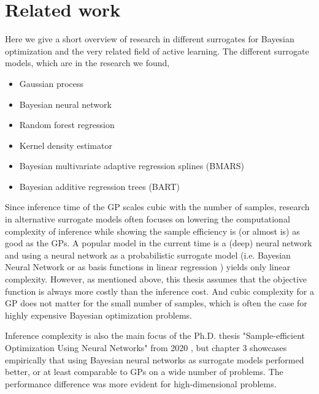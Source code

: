     

\section{Related work}
Here we give a short overview of research in different surrogates for Bayesian optimization
and the very related field of active learning. The different surrogate models, which are in the 
research we found, 
\begin{itemize}[noitemsep]
    \item Gaussian process
    \item Bayesian neural network
    \item Random forest regression
    \item Kernel density estimator
    \item Bayesian multivariate adaptive regression splines (BMARS)
    \item Bayesian additive regression trees (BART)
\end{itemize}

Since inference time of the GP scales cubic with the number of samples, research in
alternative surrogate models often focuses on lowering the computational complexity of
inference while showing the sample efficiency is (or almost is) as good as the GPs. A popular model
in the current time is a (deep) neural network and using a neural network as a probabilistic
surrogate model (i.e. Bayesian Neural Network \cite{BOHAMIANN} or as basis functions in linear
regression \cite{DNGO}) yields only linear complexity. However, as mentioned above, this thesis
assumes that the objective function is always more costly than the inference cost. And cubic
complexity for a GP does not matter for the small number of samples, which is often the case for
highly expensive Bayesian optimization problems. 

Inference complexity is also the main focus of the Ph.D. thesis "Sample-efficient Optimization Using
Neural Networks" from 2020 \cite{PhDthesis}, but chapter 3 showcases empirically that using Bayesian
neural networks as surrogate models performed better, or at least comparable to GPs on a wide number
of problems. The performance difference was more evident for high-dimensional problems.

